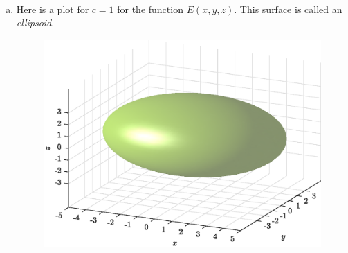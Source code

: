 \documentclass[12pt]{article} %
\begin{document}
\begin{solution}~
\begin{enumerate}[(a)]
    \item Here is a plot for $c=1$ for the function $E(x,y,z)$. This surface is called an \emph{ellipsoid}.
    \begin{figure}[H]
    \centering
        \includegraphics[width=.8\textwidth]{figures/5a}
    \end{figure}


\end{enumerate}
\end{solution}
\end{document}
